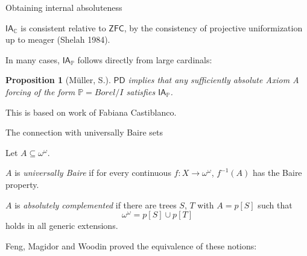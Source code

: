 \documentclass[handout, dvipsnames, usenames, 9pt, serif]{beamer}
\newtheorem{proposition}{Proposition}
\newcommand{\PP}{\mathbb{P}}
\newcommand{\CC}{\mathbb{C}}
\newcommand{\IA}{\mathsf{IA}}
\newcommand{\cb}{\color{blue}}
\begin{document}
\begin{frame}{Obtaining internal absoluteness} 

$\IA_\CC$ is consistent relative to $\mathsf{ZFC}$, by the consistency of projective uniformization up to meager (Shelah 1984). 

\pause 
\bigskip 
In many cases, $\IA_\PP$ follows directly from large cardinals: 

\begin{proposition}[M\"uller, S.] 
$\mathsf{PD}$ implies that any sufficiently absolute Axiom A forcing of the form $\PP=Borel/I$ satisfies {\cb $\IA_\PP$}. 
\end{proposition} 

\medskip 
This is based on work of Fabiana Castiblanco. 

\end{frame}




\begin{frame}{The connection with universally Baire sets} 

Let $A\subseteq \omega^\omega$. 

\begin{definition}  
$A$ is {\cb \emph{universally Baire}} if for every continuous $f\colon X\rightarrow \omega^\omega$, $f^{-1}(A)$ has the Baire property. 

\medskip 
$A$ is {\cb \emph{absolutely complemented}} if there are trees $S$, $T$ with $A=p[S]$ such that  
$$\omega^\omega=p[S]\cup p[T]$$ 
holds in all generic extensions. 
\end{definition} 

\pause 
\smallskip 
Feng, Magidor and Woodin proved the equivalence of these notions: 

\bigskip 
{ }


\end{frame} 
\end{document}
